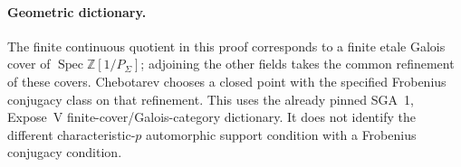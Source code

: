\paragraph{Geometric dictionary.}
The finite continuous quotient in this proof corresponds to a finite etale Galois cover of \(\operatorname{Spec}\mathbb Z[1/P_\Sigma]\); adjoining the other fields takes the common refinement of these covers. Chebotarev chooses a closed point with the specified Frobenius conjugacy class on that refinement. This uses the already pinned SGA~1, Expose~V finite-cover/Galois-category dictionary. It does not identify the different characteristic-\(p\) automorphic support condition with a Frobenius conjugacy condition.
